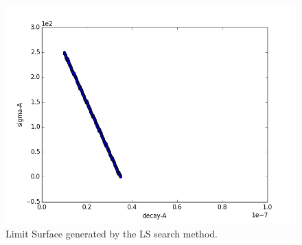  \begin{figure}[h!]
  \centering
  \includegraphics[scale=0.7]{pics/LimitSurfacePlot.png}
  \caption{Limit Surface generated by the LS search method.}
  \label{fig:LSplot}
 \end{figure}









